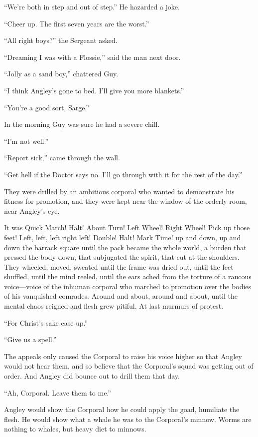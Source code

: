 ``We're both in step and out of step.'' He hazarded a joke.

``Cheer up. The first seven years are the worst.''

``All right boys?'' the Sergeant asked.

``Dreaming I was with a Flossie,'' said the man next door. 

``Jolly as a sand boy,'' chattered Guy.

``I think Angley's gone to bed. I'll give you more blankets.''

``You're a good sort, Sarge.''

In the morning Guy was sure he had a severe chill.

``I'm not well.''

``Report sick,'' came through the wall.

``Get hell if the Doctor says no. I'll go through with it for the rest 
of the day.''

They were drilled by an ambitious corporal who wanted to demonstrate 
his fitness for promotion, and they were kept near the window of the 
orderly room, near Angley's eye.

It was Quick March! Halt! About Turn! Left Wheel! Right Wheel! Pick 
up those feet! Left, left, left right left! Double! Halt! Mark Time! 
up and down, up and down the barrack square until the pack became the 
whole world, a burden that pressed the body down, that subjugated the 
spirit, that cut at the shoulders. They wheeled, moved, sweated until 
the frame was dried out, until the feet shuffled, until the mind reeled, 
until the ears ached from the torture of a raucous voice---voice of 
the inhuman corporal who marched to promotion over the bodies of his 
vanquished comrades. Around and about, around and about, until the 
mental chaos reigned and flesh grew pitiful. At last murmurs of protest.

``For Christ's sake ease up.''

``Give us a spell.''

The appeals only caused the Corporal to raise his voice higher so that 
Angley would not hear them, and so believe that the Corporal's squad was 
getting out of order. And Angley did bounce out to drill them that day.

``Ah, Corporal. Leave them to me.''

Angley would show the Corporal how he could apply the goad, humiliate the 
flesh. He would show what a whale he was to the Corporal's minnow. Worms 
are nothing to whales, but heavy diet to minnows.

